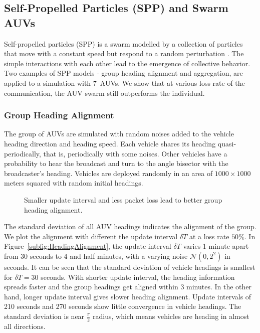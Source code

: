 \subsection{Self-Propelled Particles (SPP) and Swarm AUVs}

Self-propelled particles (SPP) is a swarm modelled by a collection of particles that move with a constant speed but respond to a random perturbation \cite{CZIROK200017}. The simple interactions with each other lead to the emergence of collective behavior. Two examples of SPP models - group heading alignment and aggregation, are applied to a simulation with $7$~AUVs. We show that at various loss rate of the communication, the AUV swarm still outperforms the individual.

\subsubsection{Group Heading Alignment}

The group of AUVs are simulated with random noises added to the vehicle heading direction and heading speed. Each vehicle shares its heading quasi-periodically, that is, periodically with some noises. Other vehicles have a probability to hear the broadcast and turn to the angle bisector with the broadcaster's heading. Vehicles are deployed randomly in an area of $1000\times 1000$ meters squared with random initial headings.

\begin{figure}[htpb]
\begin{center}
\caption{Smaller update interval and less packet loss lead to better group heading alignment.}
\label{fig:HeadingAlignment}
\end{center}
\end{figure}

The standard deviation of all AUV headings indicates the alignment of the group. We plot the alignment with different the update interval $\delta T$ at a loss rate $50\%$. In Figure~\ref{subfig:HeadingAlignment}, the update interval $\delta T$ varies 1 minute apart from 30 seconds to 4 and half minutes, with a varying noise $\mathcal{N}(0,2^2)$ in seconds. It can be seen that the standard deviation of vehicle headings is smallest for $\delta T=30$ seconds. With shorter update interval, the heading information spreads faster and the group headings get aligned within 3 minutes. In the other hand, longer update interval gives slower heading alignment. Update intervals of 210 seconds and 270 seconds show little convergence in vehicle headings. The standard deviation is near $\frac{\pi}{2}$ radius, which means vehicles are heading in almost all directions.

